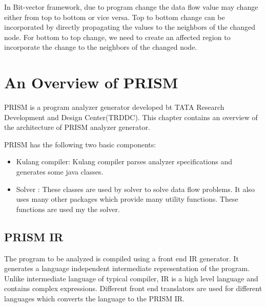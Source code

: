 \documentclass[11pt,a4paper,openright]{report}
\begin{document}
In Bit-vector framework, due to program change the data flow value may change either from top to bottom or vice versa. Top to bottom change can
be incorporated by directly propagating the values to the neighbors of the changed node. For bottom to top change, we need to create an affected 
region to incorporate the change to the neighbors of the changed node.

\chapter{An Overview of PRISM}
PRISM is a program analyzer generator developed bt TATA Research Development and Design Center(TRDDC).
This chapter contains an overview of the architecture of PRISM analyzer generator.

PRISM has the following two basic components:
\begin{itemize}
 \item Kulang compiler: Kulang compiler parses analyzer specifications and generates some java classes.
 \item Solver : These classes are used by solver to solve data flow problems. It also uses many other packages which provide many utility functions. These functions are used 
 my the solver.
\end{itemize}

\section{PRISM IR}
The program to be analyzed is compiled using a front end IR generator. It generates a language independent intermediate representation of the program. Unlike intermediate
language of typical compiler, IR is a high level language and contains complex expressions. Different front end translators are used for different languages which converts
the language to the PRISM IR.
\end{document}
